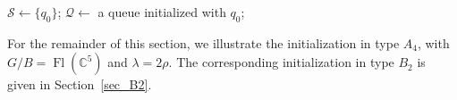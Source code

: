 \documentclass[10pt]{amsart}
\numberwithin{equation}{section}
\newcommand{\C}{{\mathbb{C}}}
\DeclareMathOperator{\flag}{Fl}
\theoremstyle{plain}
\theoremstyle{definition}
\theoremstyle{remark}
\begin{document}
\begin{algorithm}[!ht]
	\DontPrintSemicolon
	
	$\mathcal S \leftarrow \{q_0\}$;\quad
	$\mathcal Q \leftarrow$ a queue initialized with $q_0$;\
	
	\;
	\caption{Enumerating all seeds by traversing the exchange graph}\label{alg:all-seeds}
\end{algorithm}
\medskip



For the remainder of this section, we illustrate the
initialization in type $A_4$, with
$G/B=\flag(\C^5)$ and $\lambda=2\rho$.
The corresponding initialization in type $B_2$ is given
in Section~\ref{sec_B2}.
\end{document}
